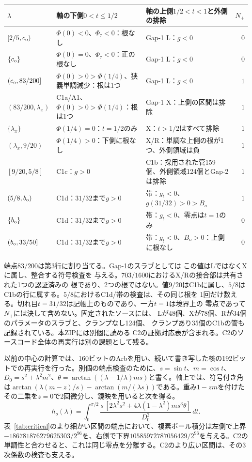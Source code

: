 \begin{center}
\begingroup\footnotesize
\setlength{\tabcolsep}{3pt}\renewcommand{\arraystretch}{1.12}
\begin{tabularx}{\linewidth}{@{}p{29mm}p{43mm}Xr@{}}
\toprule
$\lambda$ & 軸の下側$0<t\le1/2$ & 軸の上側$1/2<t<1$と外側の排除 & $N_+$\\
\midrule
$[2/5,c_{\mathrm o})$ & $\Phi(0)<0$、$\Phi_\tau<0$：根なし & Gap-1 L：$g<0$ & $0$\\
$\{c_{\mathrm o}\}$ & $\Phi(0)=0$、$\Phi_\tau<0$：正の根なし & Gap-1 L：$g<0$ & $0$\\
$(c_{\mathrm o},83/200]$ & $\Phi(0)>0>\Phi(1/4)$、狭義単調減少：根は1つ & Gap-1 L：$g<0$ & $1$\\
$(83/200,\lambda_x)$ & C1a/A1、$\Phi(0)>0>\Phi(1/4)$：根は1つ & Gap-1 X：上側の区間は排除 & $1$\\
$\{\lambda_x\}$ & $\Phi(1/4)=0$：$t=1/2$のみ & X：$t>1/2$はすべて排除 & $1$\\
$(\lambda_x,9/20)$ & $\Phi(1/4)>0$：下側に根なし & X/R：単調な上側の根が1つ、外側領域は負 & $1$\\
$[9/20,5/8]$ & C1c：$g>0$ & C1b：採用された管159個、外側領域124個とGap-2は排除 & $1$\\
$(5/8,b_{\mathrm o})$ & C1d：$31/32$まで$g>0$ & 帯：$g_t<0$、$g(31/32)>0>B_o$ & $1$\\
$\{b_{\mathrm o}\}$ & C1d：$31/32$まで$g>0$ & 帯：$g_t<0$、零点は$t=1$のみ & $0$\\
$(b_{\mathrm o},33/50]$ & C1d：$31/32$まで$g>0$ & 帯：$g_t<0$、$B_o>0$：上側に根なし & $0$\\
\bottomrule
\end{tabularx}
\endgroup
\end{center}
端点$83/200$は第3行に割り当てる。Gap-1のスラブとしては
この値はLではなくXに属し、整合する符号検査を
与える。$703/1600$におけるX/Rの接合部は共有された1つの認証済みの
根であり、2つの根ではない。値$9/20$はC1bに属し、$5/8$は
C1bの行に属する。$5/8$におけるC1d/帯の検査は、その同じ根を
1回だけ数える。切れ目$t=31/32$は記帳上のものであり、一方$t=1$は境界上の
零点であって$N_+$には決して含めない。固定されたソースには、
Lが48個、Xが78個、Rが34個のパラメータのスラブと、クランプなし124個、
クランプあり35個のC1bの管も記録されている。本ZIPには別個に読める
C2の証拠対応表が含まれる。C2のソースコード全体の再実行は別の課題として残る。

以前の中心の計算では、160ビットのArbを用い、続いて書き写した核の192ビットでの再実行を行った\citep{data-center-axis}。別個の端点検査のために、$s=\sin t$、$m=\cos t$、$D_0=s^2+\lambda^2 m^2$、$\theta=\arctan((\lambda-1/\lambda)ms)$と書く。軸上では、符号付き角は$\arctan(\lambda(m-z)/s)-\arctan(m/(\lambda s))$である。重み$1-zm$を付けたその二乗を$z=0$で2回微分し、鏡映を用いると次を得る。
\[
 h_o(\lambda)=\int_0^{\pi/2}
 \frac{s\,[2\lambda^2s^2+4\lambda(1-\lambda^2)m s^3\theta]}{D_0^2}\,dt .
\]
表~\ref{tab:critical}のより細かい区間の端点において、複素ボール積分は左側で上界$-186781876279625303/2^{96}$を、右側で下界$10585972787056429/2^{96}$を与える。C2の単調性と合わせると、これは同じ零点を分離する。C2のより広い区間は、その3次係数の検査も支える。

